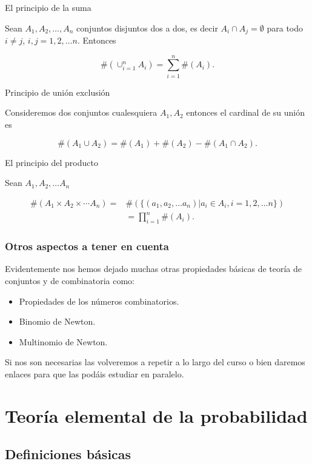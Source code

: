 \documentclass[
  letterpaper,
  DIV=11,
  numbers=noendperiod]{scrreprt}
\providecommand{\tightlist}{%
  \setlength{\itemsep}{0pt}\setlength{\parskip}{0pt}}\usepackage{longtable,booktabs,array}
\begin{document}
El principio de la suma

Sean \(A_1, A_2,\ldots, A_n\) conjuntos disjuntos dos a dos, es decir
\(A_i\cap A_j=\emptyset\) para todo \(i\not= j\), \(i,j=1,2,\ldots n\).
Entonces

\[\#(\cup_{i=1}^n A_i)=\sum_{i=1}^n \#(A_i).\]

Principio de unión exclusión

Consideremos dos conjuntos cualesquiera \(A_1, A_2\) entonces el
cardinal de su unión es

\[\#(A_1\cup A_2)=\#(A_1)+\#(A_2)-\#(A_1\cap A_2).\]

El principio del producto

Sean \(A_1,A_2,\ldots A_n\)

\[
\begin{array}{ll}
\#(A_1\times A_2\times \cdots A_n)=&\#\left(\{(a_1,a_2,\ldots a_n)| a_i\in A_i, i=1,2,\ldots n\}\right)\\
&=\prod_{i=1}^n \#(A_i).
\end{array}
\]

\subsection{Otros aspectos a tener en
cuenta}\label{otros-aspectos-a-tener-en-cuenta}

Evidentemente nos hemos dejado muchas otras propiedades básicas de
teoría de conjuntos y de combinatoria como:

\begin{itemize}
\tightlist
\item
  Propiedades de los números combinatorios.
\item
  Binomio de Newton.
\item
  Multinomio de Newton.
\end{itemize}

Si nos son necesarias las volveremos a repetir a lo largo del curso o
bien daremos enlaces para que las podáis estudiar en paralelo.

\chapter{Teoría elemental de la
probabilidad}\label{teoruxeda-elemental-de-la-probabilidad}

\section{Definiciones básicas}\label{definiciones-buxe1sicas}
\end{document}
